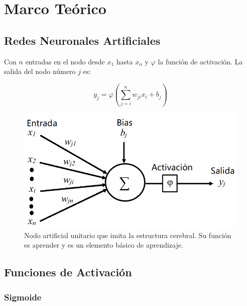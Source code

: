 \chapter{Marco Te\'orico}
\label{cap:preliminares}

\section{Redes Neuronales Artificiales}
\label{intro:redes_neuronales}

Con $n$ entradas en el nodo desde $x_1$ hasta $x_n$ y $\varphi$ la funci\'on de activaci\'on. La salida del nodo n\'umero $j$ es:

\vspace*{0.5cm}

\begin{equation}
y_j = \varphi (\displaystyle\sum_{j=i}^{n} w_{ji} x_i + b_j)
\label{eq:output_network}
\end{equation}

\vspace*{0.5cm}  %

\begin{figure}[ht]
  \centering
  \includegraphics[scale=0.40]{images/neuron_unit_sp.png}
  \caption[Nodo Artificial unitario]{Nodo artificial unitario que imita la estructura cerebral. Su funci\'on es aprender y es un elemento b\'asico de aprendizaje.}
  \label{fig:rna_neuron}
\end{figure}

\clearpage
\section{Funciones de Activaci\'on}
\label{intro:activations}

\subsection{Sigmoide}

